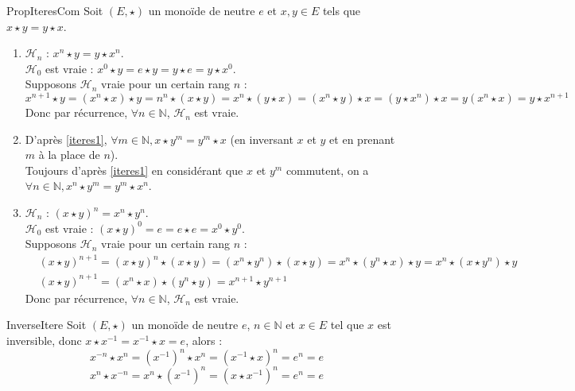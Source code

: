 \documentclass[12pt,a4paper]{report}
\begin{document}
    \begin{demonstration}{PropIteresCom}
    Soit $(E, \star)$ un monoïde de neutre $e$ et $x, y \in E$ tels que $x \star y = y \star x$.
    \begin{enumerate}[label=\bfseries\arabic*)]
        \item\label{iteres1} $\mathcal{H}_n$ : $x^n \star y = y \star x^n$.\\
        $\mathcal{H}_0$ est vraie : $x^0 \star y = e \star y = y \star e = y \star x^0$. \\
        Supposons $\mathcal{H}_n$ vraie pour un certain rang $n$ :
        $$ x^{n + 1} \star y = \left(x^n \star x\right) \star y = n^n \star (x \star y) = x^n \star (y \star x) = \left(x^n \star y\right) \star x = \left(y \star x^n\right) \star x = y \left(x^n \star x\right) = y \star x^{n + 1} $$
        Donc par récurrence, $\forall n \in \mathbb{N}$, $\mathcal{H}_n$ est vraie.
        
        \item D'après \ref{iteres1}, $\forall m \in \mathbb{N}, x \star y^m = y^m \star x$ (en inversant $x$ et $y$ et en prenant $m$ à la place de $n$).\\
        Toujours d'après \ref{iteres1} en considérant que $x$ et $y^m$ commutent, on a $\forall n \in \mathbb{N}, x^n \star y^m = y^m \star x^n$.
        
        \item $\mathcal{H}_n$ : $(x \star y)^n = x^n \star y^n$.\\
        $\mathcal{H}_0$ est vraie : $(x \star y)^0 = e = e \star e = x^0 \star y^0$. \\
        Supposons $\mathcal{H}_n$ vraie pour un certain rang $n$ :
        \begin{align*}
            &(x \star y)^{n + 1} = (x \star y)^n \star (x \star y) = \left(x^n \star y^n\right) \star (x \star y) = x^n \star \left(y^n \star x\right) \star y = x^n \star \left(x \star y^n\right) \star y \\
            &(x \star y)^{n + 1} = \left(x^n \star x\right) \star \left(y^n \star y\right) = x^{n + 1} \star y^{n + 1}
        \end{align*}
        Donc par récurrence, $\forall n \in \mathbb{N}$, $\mathcal{H}_n$ est vraie.
    \end{enumerate}
    \end{demonstration}
    
    \begin{demonstration}{InverseItere}
    Soit $(E, \star)$ un monoïde de neutre $e$, $n \in \mathbb{N}$ et $x \in E$ tel que $x$ est inversible, donc $x \star x^{-1} = x^{-1} \star x = e$, alors :
    $$ x^{-n} \star x^n = \left(x^{-1}\right)^n \star x^n = \left(x^{-1} \star x\right)^n = e^n = e $$
    $$ x^n \star x^{-n} = x^n \star \left(x^{-1}\right)^n = \left(x \star x^{-1}\right)^n = e^n = e $$
    \end{demonstration}
    
\end{document}
